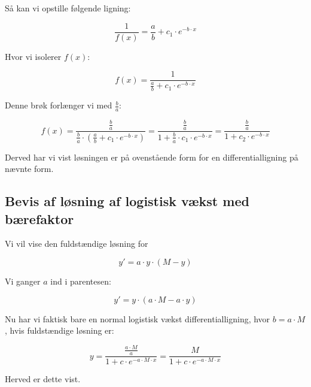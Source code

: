 \begin{proofw}
Så kan vi opstille følgende ligning:

$$
    \frac{1}{f(x)}=\frac{a}{b}+c_1 \cdot e^{-b\cdot x}
$$

Hvor vi isolerer $f(x)$:

$$
    f(x)=\frac{1}{\frac{a}{b}+c_1 \cdot e^{-b\cdot x}}
$$

Denne brøk forlænger vi med $\frac{b}{a}$:

$$
    f(x)=\frac{\frac{b}{a}}{\frac{b}{a} \cdot (\frac{a}{b}+c_1 \cdot e^{-b\cdot x})}
    =\frac{\frac{b}{a}}{
        1+\frac{b}{a}\cdot c_1 \cdot e^{-b \cdot x}
    }
    =
    \frac{\frac{b}{a}}{
        1+c_2 \cdot e^{-b \cdot x}
    }
$$

Derved har vi vist løsningen er på ovenstående form for
en differentialligning på nævnte form.

\end{proofw}

\subsection{Bevis af løsning af logistisk vækst med bærefaktor}

\begin{proofw}
    
Vi vil vise den fuldstændige løsning for 

$$y'=a \cdot y \cdot (M-y)$$

Vi ganger $a$ ind i parentesen:

$$y'=y \cdot (a\cdot M-a \cdot y)$$

Nu har vi faktisk bare en normal logistisk vækst differentialligning,
hvor $b=a \cdot M$, hvis fuldstændige løsning er:

$$
    y=\frac{
\frac{a \cdot M}{a}
    }{
        1+c \cdot e^{-a\cdot M \cdot x}
    }=
    \frac{
M
    }{
        1+c \cdot e^{-a\cdot M \cdot x}
    }
$$

Herved er dette vist.

\end{proofw}
